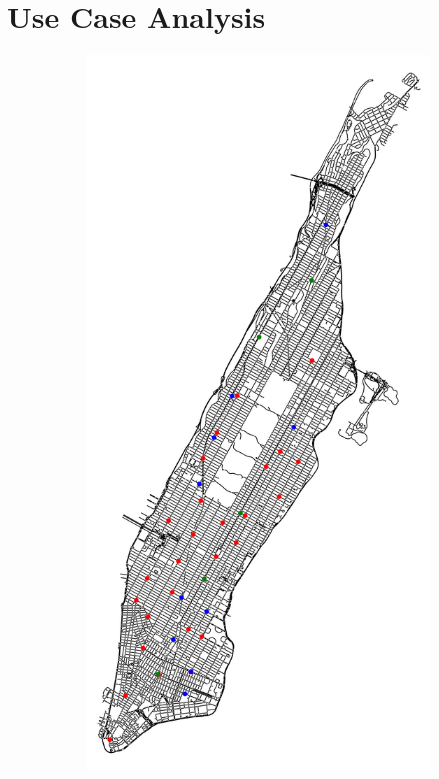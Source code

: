 \section{Use Case Analysis}
\begin{figure}[tbh]
	\centering
	\begin{subfigure}[b]{0.32\textwidth}
		\centering
		\includegraphics[width=\textwidth]{assets/img/07_graph_based/new_york_vanilla_info.png}

\end{subfigure}
\end{figure}
